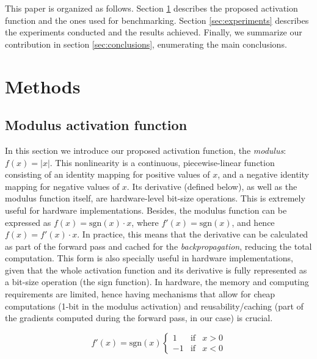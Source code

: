 \documentclass[authoryear]{elsarticle}
\begin{document}
This paper is organized as follows. Section \ref{sec:methods} describes the proposed activation function and the ones used for benchmarking. Section \ref{sec:experiments} describes the experiments conducted and the results achieved. Finally, we summarize our contribution in section \ref{sec:conclusions}, enumerating the main conclusions.



\section{Methods} \label{sec:methods}
\subsection{Modulus activation function}
In this section we introduce our proposed activation function, the \textit{modulus}: $f(x)=|x|$. This nonlinearity is a continuous, piecewise-linear function consisting of an identity mapping for positive values of $x$, and a negative identity mapping for negative values of $x$. Its derivative (defined below), as well as the modulus function itself, are hardware-level bit-size operations. This is extremely useful for hardware implementations. Besides, the modulus function can be expressed as $f(x) = \text{sgn}(x)\cdot x$, where $ f'(x) = \text{sgn}(x)$, and hence $f(x) = f'(x)\cdot x$. In practice, this means that the derivative can be calculated as part of the forward pass and cached for the \textit{backpropagation}, reducing the total computation. This form is also specially useful in hardware implementations, given that the whole activation function and its derivative is fully represented as a bit-size operation (the sign function). In hardware, the memory and computing requirements are limited, hence having mechanisms that allow for cheap computations (1-bit in the modulus activation) and reusability/caching (part of the gradients computed during the forward pass, in our case) is crucial. %

\begin{equation}
f'(x)= \mathrm{sgn}(x) \left\{ \begin{array}{lcc}
1 &   \text{if}  & x > 0 \\
-1 &  \text{if} & x < 0 
\end{array} \right.
\end{equation}
\end{document}
